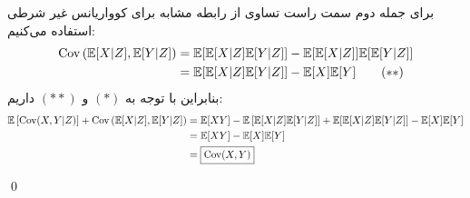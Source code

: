 \documentclass[a4paper, 11pt]{article}
\begin{document}
\begin{enumerate}[1.]
\[	\label{eq:first-term}
	\]
	برای جمله دوم سمت راست تساوی از رابطه مشابه برای کوواریانس غیر شرطی استفاده می‌کنیم:
	\[
	\begin{aligned}
		\mathrm{Cov}\left({\mathbb E}[X|Z], {\mathbb E}[Y|Z]\right)	&= {\mathbb E}[{\mathbb E}[X|Z]{\mathbb E}[Y|Z]] - {\mathbb E}[{\mathbb E}[X|Z]]{\mathbb E}[{\mathbb E}[Y|Z]] \\
											&= {\mathbb E}[{\mathbb E}[X|Z]{\mathbb E}[Y|Z]] - {\mathbb E}[X]{\mathbb E}[Y] \qquad (\ast\ast)
	\end{aligned}
	\]
	بنابراین با توجه به
	$(\ast)$
	و 
	$(\ast \ast)$
	داریم:
	\[
	\begin{aligned}
		{\mathbb E}\left[\mathrm{Cov}(X,Y|Z)\right] + \mathrm{Cov}\left({\mathbb E}[X|Z], {\mathbb E}[Y|Z]\right)	&= {\mathbb E}[XY] - {\mathbb E}\left[{\mathbb E}[X|Z]{\mathbb E}[Y|Z]\right] + {\mathbb E}[{\mathbb E}[X|Z]{\mathbb E}[Y|Z]] - {\mathbb E}[X]{\mathbb E}[Y] \\
		&= {\mathbb E}[XY] - {\mathbb E}[X]{\mathbb E}[Y] \\
		&= \boxed{\mathrm{Cov}(X, Y)}
	\end{aligned}
	\]
\end{enumerate}
\qed
\end{document}
